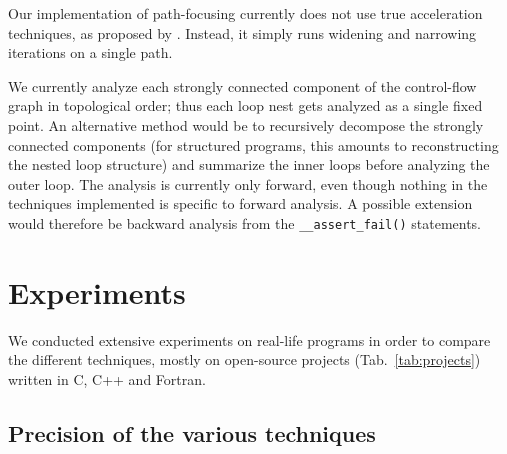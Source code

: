 \documentclass{entcs}
\begin{document}
Our implementation of path-focusing currently does not use true acceleration
techniques, as proposed by \citet{Monniaux_Gonnord_SAS11}. Instead, it simply runs widening and narrowing iterations on a single path.

We currently analyze each strongly connected component of the control-flow graph in topological order; thus each loop nest gets analyzed as a single fixed point.
An alternative method would be to recursively decompose the strongly connected components (for structured programs, this amounts to reconstructing the nested loop structure) and summarize the inner loops before analyzing the outer loop.
The analysis is currently only forward, even though nothing in the techniques
implemented is specific to forward analysis. A possible extension would therefore be backward analysis from the \lstinline|__assert_fail()| statements.

\section{Experiments}
\label{sec:experiments}

We conducted extensive experiments on real-life programs in order to compare the
different techniques, mostly on open-source projects (Tab.~\ref{tab:projects}) written in C, C++ and Fortran.

\subsection{Precision of the various techniques}

%     
\end{document}
